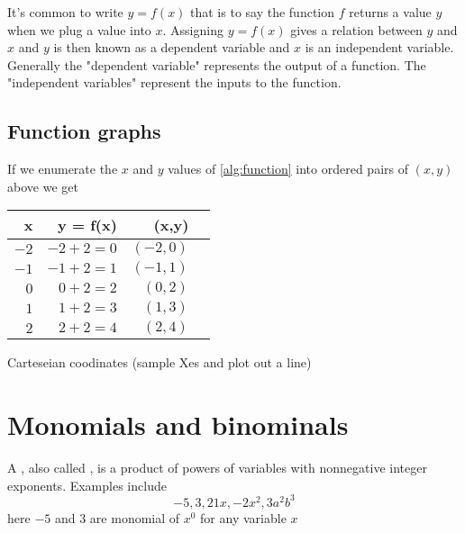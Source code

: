 It's common to write $y = f(x)$ that is to say the function $f$ returns 
a value $y$ when we plug a value into $x$. Assigning $y = f(x)$ gives a 
relation between $y$ and $x$ and $y$ is then known as a dependent variable 
and $x$ is an independent variable. Generally the "dependent variable" 
represents the output of a function. The "independent variables" represent 
the inputs to the function.

\subsection{Function graphs}
If we enumerate the $x$ and $y$ values of \ref{alg:function} into ordered 
pairs of $(x, y)$ above we get 
\begin{table}[H]
\centering
\begin{tabular}{|r|r|r|r|}
\hline
\textbf{x} & \textbf{y = f(x)} & \textbf{(x,y)} \\ \hline
$-2$       & $-2 + 2 =  0$     & $(-2,  0)$     \\ \hline
$-1$       & $-1 + 2 =  1$     & $(-1,  1)$     \\ \hline
$0$        & $ 0 + 2 =  2$     & $( 0,  2)$     \\ \hline
$1$        & $ 1 + 2 =  3$     & $( 1,  3)$     \\ \hline
$2$        & $ 2 + 2 =  4$     & $( 2,  4)$     \\ \hline
\end{tabular}
\end{table}

Carteseian coodinates (sample Xes and plot out a line)

\begin{figure}[H]
\centering
{}
\end{figure}




\section{Monomials and binominals}
A , also called , is a product of
powers of variables with nonnegative integer exponents. Examples include
\[
-5, 3, 21x, -2x^2, 3a^2b^3
\]
here $-5$ and $3$ are monomial of $x^0$ for any variable $x$

